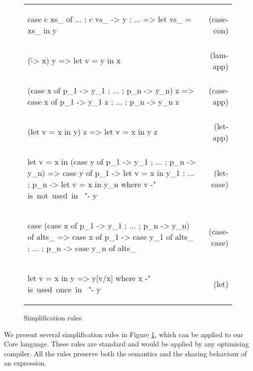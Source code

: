 \begin{figure}
\renewcommand{\f}[2]{\vspace{-7mm} #2 & (#1) \\}

\begin{flushright}
\begin{tabular}{p{8cm}r}
\f{case-con}{
\begin{code}
case c xs_ of {... ; c vs_ -> y ; ...}
    => let vs_ = xs_ in y
\end{code}}

\f{lam-app}{
\begin{code}
(\v -> x) y
    => let v = y in x
\end{code}}

\f{case-app}{
\begin{code}
(case x of {p_1 -> y_1 ; ... ; p_n -> y_n}) z
    => case x of {p_1 -> y_1 z ; ... ; p_n -> y_n z}
\end{code}}

\f{let-app}{
\begin{code}
(let v = x in y) z
    => let v = x in y z
\end{code}}

\f{let-case}{
\begin{code}
let v = x in (case y of {p_1 -> y_1 ; ... ; p_n -> y_n})
    => case y of  {  p_1  -> let v = x in y_1
                  ;  ...
                  ;  p_n  -> let v = x in y_n}
    where v {-" \hbox{is not used in } "-} y
\end{code}}

\f{case-case}{
\begin{code}
case (case x of {p_1 -> y_1 ; ... ; p_n -> y_n}) of alts_
    => case x of  {  p_1  -> case y_1 of alts_
                  ;  ...
                  ;  p_n  -> case y_n of alts_ }
\end{code}}

\f{let}{
\begin{code}
let v = x in y
    => y[v/x]
    where x {-" \hbox{is used once in } "-} y
\end{code}}
\end{tabular}
\end{flushright}
\caption{Simplification rules.}
\label{fig:simplify}
\end{figure}

We present several simplification rules in Figure \ref{fig:simplify}, which can be applied to our Core language. These rules are standard and would be applied by any optimising compiler. All the rules preserve both the semantics and the sharing behaviour of an expression.

